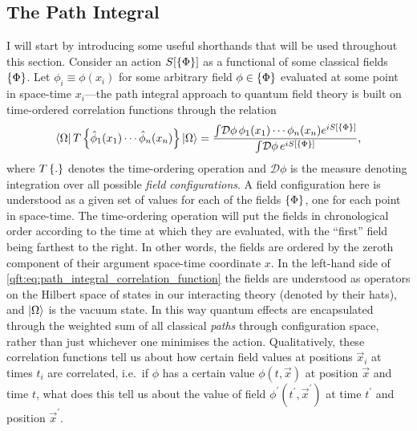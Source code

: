 \documentclass[../main.tex]{subfiles}
\begin{document}
\subsection{The Path Integral}
I will start by introducing some useful shorthands that will be used throughout this section.
Consider an action \(S[\left\{\Phi\right\}]\) as a functional of some classical fields \(\left\{\Phi\right\}\). Let \(\phi_i \equiv \phi(x_i)\) for some arbitrary field \(\phi \in \left\{\Phi\right\}\) evaluated at some point in space-time \(x_i\)---the path integral approach to quantum field theory is built on time-ordered correlation functions through the relation~\cite{Schwartz:2014sze}
\begin{equation}
  \label{qft:eq:path_integral_correlation_function}
  \left\langle \Omega \right| T\left\{\hat\phi_1(x_1) \cdots \hat\phi_n(x_n)\right\} \left| \Omega \right\rangle = \frac{\int\!\mathcal{D}\phi\, \phi_1(x_1) \cdots \phi_n(x_n) e^{iS[\left\{\Phi\right\}]}}{\int\!\mathcal{D}\phi\, e^{iS[\left\{\Phi\right\}]}},
\end{equation}
where \(T\left\{.\right\}\) denotes the time-ordering operation and \(\mathcal{D}\phi\) is the measure denoting integration over all possible \emph{field configurations}.
A field configuration here is understood as a given set of values for each of the fields \(\left\{\Phi\right\}\), one for each point in space-time.
The time-ordering operation will put the fields in chronological order according to the time at which they are evaluated, with the ``first'' field being farthest to the right.
In other words, the fields are ordered by the zeroth component of their argument space-time coordinate \(x\).
In the left-hand side of \cref{qft:eq:path_integral_correlation_function} the fields are understood as operators on the Hilbert space of states in our interacting theory (denoted by their hats), and \(\left| \Omega \right\rangle\) is the vacuum state.
In this way quantum effects are encapsulated through the weighted sum of all classical \emph{paths} through configuration space, rather than just whichever one minimises the action.
Qualitatively, these correlation functions tell us about how certain field values at positions \(\vec{x}_i\) at times \(t_i\) are correlated, i.e.\ if \(\phi\) has a certain value \(\phi(t, \vec{x})\) at position \(\vec{x}\) and time \(t\), what does this tell us about the value of field \(\phi^\prime(t^\prime, \vec{x}^\prime)\) at time \(t^\prime\) and position \(\vec{x}^\prime\).
\end{document}
